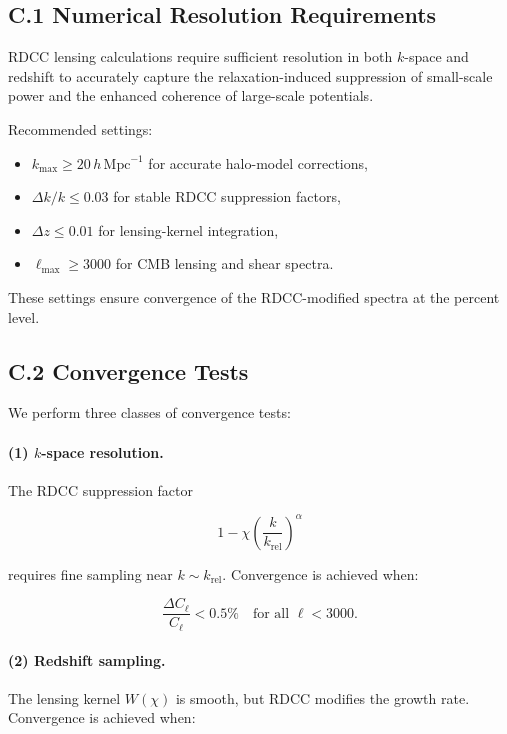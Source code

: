 \documentclass[11pt,a4paper]{article}
\begin{document}
\subsection*{C.1 Numerical Resolution Requirements}

RDCC lensing calculations require sufficient resolution in both $k$-space and redshift to
accurately capture the relaxation-induced suppression of small-scale power and the enhanced
coherence of large-scale potentials.

Recommended settings:
\begin{itemize}
\item $k_{\mathrm{max}} \geq 20\,h\,\mathrm{Mpc}^{-1}$ for accurate halo-model corrections,
\item $\Delta k / k \leq 0.03$ for stable RDCC suppression factors,
\item $\Delta z \leq 0.01$ for lensing-kernel integration,
\item $\ell_{\mathrm{max}} \geq 3000$ for CMB lensing and shear spectra.
\end{itemize}

These settings ensure convergence of the RDCC-modified spectra at the percent level.

\subsection*{C.2 Convergence Tests}

We perform three classes of convergence tests:

\paragraph{(1) $k$-space resolution.}
The RDCC suppression factor


\[
1 - \chi\left(\frac{k}{k_{\mathrm{rel}}}\right)^{\alpha}
\]


requires fine sampling near $k \sim k_{\mathrm{rel}}$.
Convergence is achieved when:


\[
\frac{\Delta C_{\ell}}{C_{\ell}} < 0.5\%
\quad \text{for all } \ell < 3000.
\]



\paragraph{(2) Redshift sampling.}
The lensing kernel $W(\chi)$ is smooth, but RDCC modifies the growth rate.
Convergence is achieved when:
\end{document}
